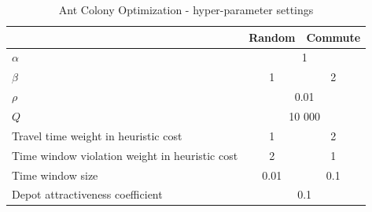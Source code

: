 \begin{table}
    \centering
    \begin{tabular}{lcc}
         & Random & Commute \\
        \hline
        $\alpha$ & \multicolumn{2}{c}{1} \\
        $\beta$ & 1 & 2 \\
        $\rho$ & \multicolumn{2}{c}{0.01} \\
        $Q$ & \multicolumn{2}{c}{10 000} \\
        Travel time weight in heuristic cost & 1 & 2 \\
        Time window violation weight in heuristic cost & 2 & 1 \\
        Time window size & 0.01 & 0.1 \\
        Depot attractiveness coefficient & \multicolumn{2}{c}{0.1}
    \end{tabular}
    \caption{Ant Colony Optimization - hyper-parameter settings}
    \label{tab:aco_hyperparams}
\end{table}